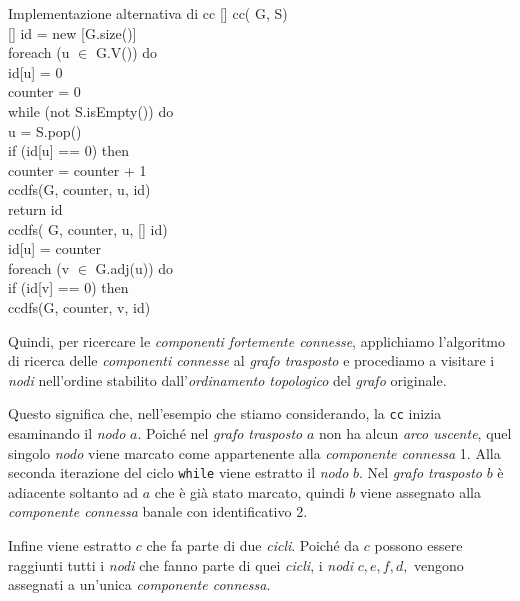 \begin{code}{Implementazione alternativa di cc}
\noindent\rmbreak\ind{}[] cc( G,  S)\\
    [] id = new [G.size()]\\
    \ind foreach (u $\in$ G.V()) do\\
        \indf id[u] = 0\\
    \ind{} counter = 0\\
    while (not S.isEmpty()) do\\
        \indf{} u = S.pop()\\
        if (id[u] == 0) then\\
            \indff counter = counter + 1\\
            \indff ccdfs(G, counter, u, id)\\
    \ind return id\\

\nl{}
\rmbreak\ind ccdfs( G,  counter,  u, [] id)\\
    id[u] = counter\\
    \ind foreach (v $\in$ G.adj(u)) do\\
        \indf if (id[v] == 0) then\\
            \indff ccdfs(G, counter, v, id)
\end{code}\noindent
Quindi, per ricercare le \emph{componenti fortemente connesse}, applichiamo
l'algoritmo di ricerca delle \emph{componenti connesse} al \emph{grafo trasposto}
e procediamo a visitare i \emph{nodi} nell'ordine stabilito
dall'\emph{ordinamento topologico} del \emph{grafo} originale.

Questo significa che, nell'esempio che stiamo considerando, la \texttt{cc}
inizia esaminando il \emph{nodo} $a$. Poiché nel \emph{grafo trasposto} $a$
non ha alcun \emph{arco uscente}, quel singolo \emph{nodo} viene marcato come
appartenente alla \emph{componente connessa} 1. Alla seconda iterazione del
ciclo \texttt{while} viene estratto il \emph{nodo} $b$. Nel \emph{grafo
trasposto} $b$ è adiacente soltanto ad $a$ che è già stato marcato, quindi
$b$ viene assegnato alla \emph{componente connessa} banale con identificativo 2.

Infine viene estratto $c$ che fa parte di due \emph{cicli}. Poiché da $c$ possono
essere raggiunti tutti i \emph{nodi} che fanno parte di quei \emph{cicli}, i
\emph{nodi} $c,e,f,d,$ vengono assegnati a un'unica \emph{componente connessa}.

